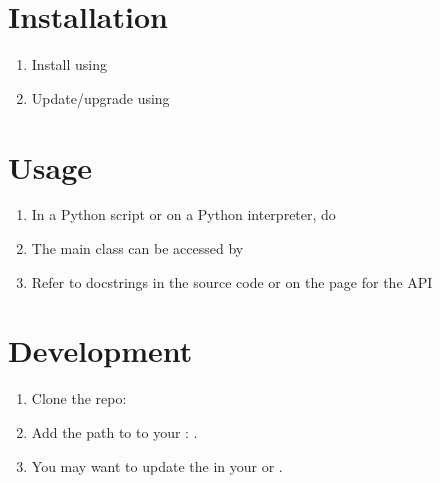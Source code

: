 \documentclass[letterpaper,10pt,english]{sphinxmanual}
\begin{document}
\chapter{Installation}
\label{\detokenize{index:installation}}\begin{enumerate}
%
\item {} 
\sphinxAtStartPar
Install using 

\item {} 
\sphinxAtStartPar
Update/upgrade using 

\end{enumerate}


\chapter{Usage}
\label{\detokenize{index:usage}}\begin{enumerate}
%
\item {} 
\sphinxAtStartPar
In a Python script or on a Python interpreter, do 

\item {} 
\sphinxAtStartPar
The main class can be accessed by 

\item {} 
\sphinxAtStartPar
Refer to docstrings in the source code or on the  page for the API

\end{enumerate}


\chapter{Development}
\label{\detokenize{index:development}}\begin{enumerate}
%
\item {} 
\sphinxAtStartPar
Clone the  repo: 

\item {} 
\sphinxAtStartPar
Add the path to  to your : .

\item {} 
\sphinxAtStartPar
You may want to update the  in your  or .

\end{enumerate}
\end{document}

